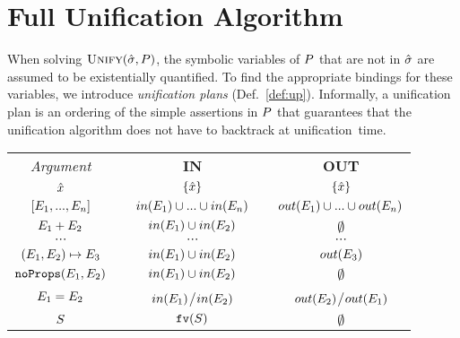 
\section{Full Unification Algorithm}

When solving $\textsc{Unify}(\hat{\sigma}, P)$, the symbolic variables of $P$ that are not 
in $\hat{\sigma}$ are assumed to be existentially quantified. 
To find the appropriate bindings for these variables, we 
introduce \emph{unification plans} (Def.~\ref{def:up}).
Informally, a unification plan is an ordering of the simple assertions in $P$ that 
guarantees that the unification algorithm does not have to backtrack at unification~time. 

\begin{table}[!h]
{\small \begin{tabular}{@{}c@{}ccc@{}c@{}}\toprule
\emph{Argument} & & \textbf{IN}  & & \textbf{OUT}  \\
\cmidrule{1-1} \cmidrule{3-3} \cmidrule{5-5}

$\hat{x}$                                                       & & $\{ \hat{x} \}$                                                          & & $\{ \hat{x} \}$    \\
$[ E_1, ..., E_n ]$                     & & $in(E_1) \cup ... \cup in(E_n)$      & & $out(E_1) \cup ... \cup out(E_n)$ \\
$E_1 + E_2$                                    & & $in(E_1) \cup in(E_2)$                  & & $\emptyset$ \\
$\cdots$ & & $\cdots$ & & $\cdots$ \\[1pt]
$(E_1, E_2)\mapsto E_3$   & & $in(E_1) \cup in(E_2)$ & & $out(E_3)$  \\
%
$\texttt{noProps}(E_1, E_2)$           &  & $in(E_1) \cup in(E_2)$ & & $\emptyset$ \\
%
$E_1 = E_2$                               & & $in(E_1)$/$in(E_2)$      & & $out(E_2)$/$out(E_1)$ \\
%
$S$                                                    & & $\texttt{fv}(S)$                                           & & $\emptyset$ \\
\bottomrule
\end{tabular}}
\end{table}

